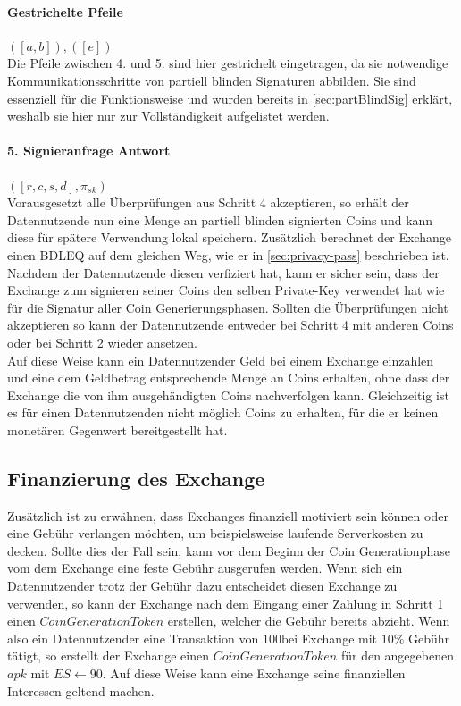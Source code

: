 \documentclass{scrreprt}
\begin{document}
\paragraph*{Gestrichelte Pfeile} $([a,b]), ([e])$\\
Die Pfeile zwischen 4. und 5. sind hier gestrichelt eingetragen, da sie notwendige Kommunikationsschritte von partiell blinden Signaturen abbilden. Sie sind essenziell für die Funktionsweise und wurden bereits in \ref{sec:partBlindSig} erklärt, weshalb sie hier nur zur Vollständigkeit aufgelistet werden.

\paragraph{5. Signieranfrage Antwort} $([r,c,s,d], \pi_{sk})$ \\
Vorausgesetzt alle Überprüfungen aus Schritt 4 akzeptieren, so erhält der Datennutzende nun eine Menge an partiell blinden signierten Coins und kann diese für spätere Verwendung lokal speichern. Zusätzlich berechnet der Exchange einen BDLEQ auf dem gleichen Weg, wie er in \ref{sec:privacy-pass} beschrieben ist. Nachdem der Datennutzende diesen verfiziert hat, kann er sicher sein, dass der Exchange zum signieren seiner Coins den selben Private-Key verwendet hat wie für die Signatur aller Coin Generierungsphasen. Sollten die Überprüfungen nicht akzeptieren so kann der Datennutzende entweder bei Schritt 4 mit anderen Coins oder bei Schritt 2 wieder ansetzen.\\

Auf diese Weise kann ein Datennutzender Geld bei einem Exchange einzahlen und eine dem Geldbetrag entsprechende Menge an Coins erhalten, ohne dass der Exchange die von ihm ausgehändigten Coins nachverfolgen kann. Gleichzeitig ist es für einen Datennutzenden nicht möglich Coins zu erhalten, für die er keinen monetären Gegenwert bereitgestellt hat.
\subsection{Finanzierung des Exchange}
Zusätzlich ist zu erwähnen, dass Exchanges finanziell motiviert sein können oder eine Gebühr verlangen möchten, um beispielsweise laufende Serverkosten zu decken. Sollte dies der Fall sein, kann vor dem Beginn der Coin Generationphase vom dem Exchange eine feste Gebühr ausgerufen werden. Wenn sich ein Datennutzender trotz der Gebühr dazu entscheidet diesen Exchange zu verwenden, so kann der Exchange nach dem Eingang einer Zahlung in Schritt 1 einen $CoinGenerationToken$ erstellen, welcher die Gebühr bereits abzieht. Wenn also ein Datennutzender eine Transaktion von $100$\texteuro bei Exchange mit $10\%$ Gebühr tätigt, so erstellt der Exchange einen $CoinGenerationToken$ für den angegebenen $apk$ mit $ES \leftarrow 90$\texteuro. Auf diese Weise kann eine Exchange seine finanziellen Interessen geltend machen. 
\end{document}
